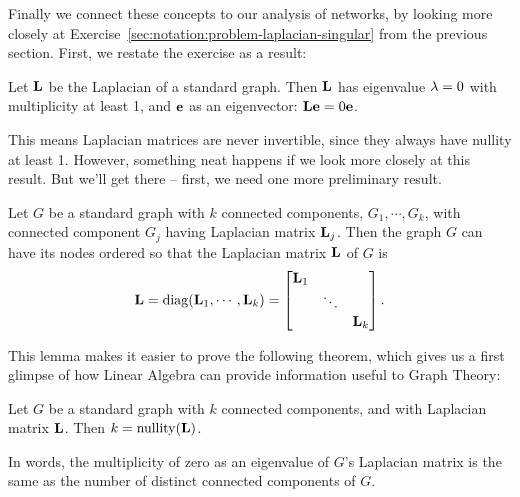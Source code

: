 Finally we connect these concepts to our analysis of networks, by looking more closely at Exercise~\ref{sec:notation:problem-laplacian-singular} from the previous section.
First, we restate the exercise as a result:
\begin{proposition}
Let $\textbf{L}$ be the Laplacian of a standard graph. Then $\textbf{L}$ has eigenvalue $\lambda = 0$ with multiplicity at least 1, and $\textbf{e}$ as an eigenvector: $\textbf{L}\textbf{e} = 0\textbf{e}$.
\end{proposition}
This means Laplacian matrices are never invertible, since they always have nullity at least 1. However, something neat happens if we look more closely at this result.
But we'll get there -- first, we need one more preliminary result.
\begin{lemma}
  Let $G$ be a standard graph with $k$ connected components, $G_1, \cdots, G_k$, with connected component $G_j$ having Laplacian matrix $\textbf{L}_j$. Then the graph $G$ can have its nodes ordered so that the Laplacian matrix $\textbf{L}$ of $G$ is
  \[
\textbf{L} = \operatorname{diag}( \textbf{L}_1, \cdots, \textbf{L}_k ) = \begin{bmatrix} \textbf{L}_1 & & \\  & \ddots &  \\  &  &  \textbf{L}_k \end{bmatrix}.
  \]
\end{lemma}
This lemma makes it easier to prove the following theorem, which gives us a first glimpse of how Linear Algebra can provide information useful to Graph Theory:
\begin{theorem}
  Let $G$ be a standard graph with $k$ connected components, and with Laplacian matrix $\textbf{L}$. Then $k = \operatorname{nullity}(\textbf{L})$.
\end{theorem}
In words, the multiplicity of zero as an eigenvalue of $G$'s Laplacian matrix is the same as the number of distinct connected components of $G$.
